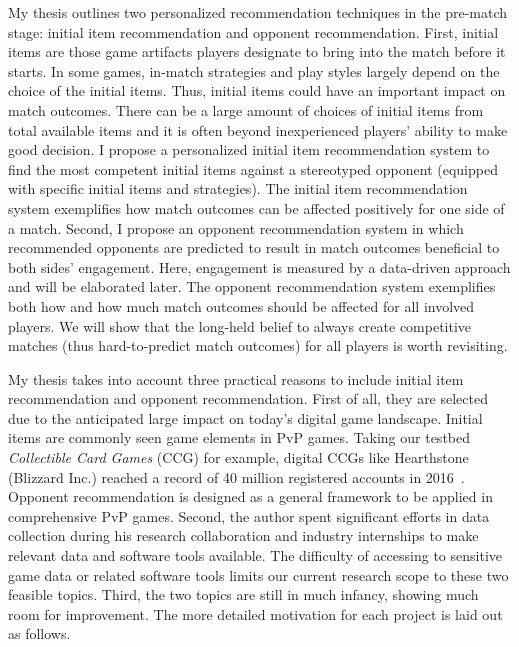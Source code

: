 My thesis outlines two personalized recommendation techniques in the pre-match stage: initial item recommendation and opponent recommendation. First, initial items are those game artifacts players designate to bring into the match before it starts. In some games, in-match strategies and play styles largely depend on the choice of the initial items. Thus, initial items could have an important impact on match outcomes. There can be a large amount of choices of initial items from total available items and it is often beyond inexperienced players' ability to make good decision. I propose a personalized initial item recommendation system to find the most competent initial items against a stereotyped opponent (equipped with specific initial items and strategies). The initial item recommendation system exemplifies how match outcomes can be affected positively for one side of a match. Second, I propose an opponent recommendation system in which recommended opponents are predicted to result in match outcomes beneficial to both sides' engagement. Here, engagement is measured by a data-driven approach and will be elaborated later. The opponent recommendation system exemplifies both how and how much match outcomes should be affected for all involved players. We will show that the long-held belief to always create competitive matches (thus hard-to-predict match outcomes) for all players is worth revisiting.

My thesis takes into account three practical reasons to include initial item recommendation and opponent recommendation. First of all, they are selected due to the anticipated large impact on today's digital game landscape. Initial items are commonly seen game elements in PvP games. Taking our testbed \textit{Collectible Card Games} (CCG) for example, digital CCGs like Hearthstone (Blizzard Inc.) reached a record of 40 million registered accounts in 2016~\cite{hearthstonepopular}. Opponent recommendation is designed as a general framework to be applied in comprehensive PvP games. Second, the author spent significant efforts in data collection during his research collaboration and industry internships to make relevant data and software tools available. The difficulty of accessing to sensitive game data or related software tools limits our current research scope to these two feasible topics. Third, the two topics are still in much infancy, showing much room for improvement. The more detailed motivation for each project is laid out as follows. 


